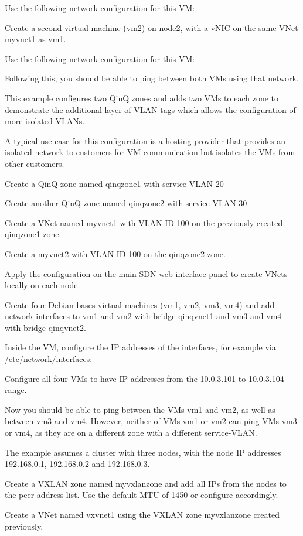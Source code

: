 Use the following network configuration for this VM:

Create a second virtual machine (vm2) on node2, with a vNIC on the same VNet myvnet1 as vm1.

Use the following network configuration for this VM:

Following this, you should be able to ping between both VMs using that network.

This example configures two QinQ zones and adds two VMs to each zone to demonstrate the additional layer of VLAN tags which allows the configuration of more isolated VLANs.

A typical use case for this configuration is a hosting provider that provides an isolated network to customers for VM communication but isolates the VMs from other customers.

Create a QinQ zone named qinqzone1 with service VLAN 20

Create another QinQ zone named qinqzone2 with service VLAN 30

Create a VNet named myvnet1 with VLAN-ID 100 on the previously created qinqzone1 zone.

Create a myvnet2 with VLAN-ID 100 on the qinqzone2 zone.

Apply the configuration on the main SDN web interface panel to create VNets locally on each node.

Create four Debian-bases virtual machines (vm1, vm2, vm3, vm4) and add network interfaces to vm1 and vm2 with bridge qinqvnet1 and vm3 and vm4 with bridge qinqvnet2.

Inside the VM, configure the IP addresses of the interfaces, for example via /etc/network/interfaces:

Configure all four VMs to have IP addresses from the 10.0.3.101 to 10.0.3.104 range.

Now you should be able to ping between the VMs vm1 and vm2, as well as between vm3 and vm4. However, neither of VMs vm1 or vm2 can ping VMs vm3 or vm4, as they are on a different zone with a different service-VLAN.

The example assumes a cluster with three nodes, with the node IP addresses 192.168.0.1, 192.168.0.2 and 192.168.0.3.

Create a VXLAN zone named myvxlanzone and add all IPs from the nodes to the peer address list. Use the default MTU of 1450 or configure accordingly.

Create a VNet named vxvnet1 using the VXLAN zone myvxlanzone created previously.

